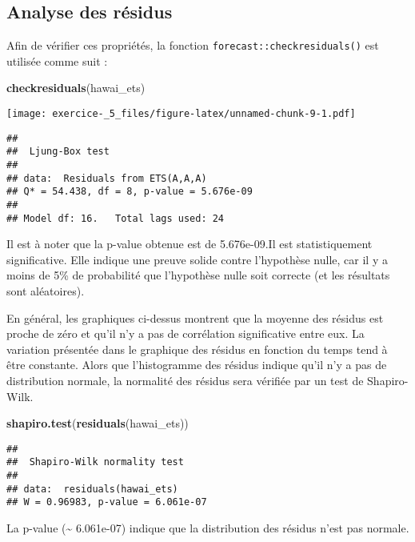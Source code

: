\documentclass[
]{article}
\newenvironment{Shaded}{\begin{snugshade}}{\end{snugshade}}
\newcommand{\KeywordTok}[1]{\textcolor[rgb]{0.13,0.29,0.53}{\textbf{#1}}}
\newcommand{\NormalTok}[1]{#1}
\begin{document}
\hypertarget{analyse-des-ruxe9sidus}{%
\subsection{Analyse des résidus}\label{analyse-des-ruxe9sidus}}

Afin de vérifier ces propriétés, la fonction
\texttt{forecast::checkresiduals()} est utilisée comme suit :

\begin{Shaded}
\begin{Highlighting}[]
\KeywordTok{checkresiduals}\NormalTok{(hawai_ets)}
\end{Highlighting}
\end{Shaded}

\texttt{[image: exercice-\_5\_files/figure-latex/unnamed-chunk-9-1.pdf]}

\begin{verbatim}
## 
##  Ljung-Box test
## 
## data:  Residuals from ETS(A,A,A)
## Q* = 54.438, df = 8, p-value = 5.676e-09
## 
## Model df: 16.   Total lags used: 24
\end{verbatim}

Il est à noter que la p-value obtenue est de 5.676e-09.Il est
statistiquement significative. Elle indique une preuve solide contre
l'hypothèse nulle, car il y a moins de 5\% de probabilité que
l'hypothèse nulle soit correcte (et les résultats sont aléatoires).

En général, les graphiques ci-dessus montrent que la moyenne des résidus
est proche de zéro et qu'il n'y a pas de corrélation significative entre
eux. La variation présentée dans le graphique des résidus en fonction du
temps tend à être constante. Alors que l'histogramme des résidus indique
qu'il n'y a pas de distribution normale, la normalité des résidus sera
vérifiée par un test de Shapiro-Wilk.

\begin{Shaded}
\begin{Highlighting}[]
\KeywordTok{shapiro.test}\NormalTok{(}\KeywordTok{residuals}\NormalTok{(hawai_ets))}
\end{Highlighting}
\end{Shaded}

\begin{verbatim}
## 
##  Shapiro-Wilk normality test
## 
## data:  residuals(hawai_ets)
## W = 0.96983, p-value = 6.061e-07
\end{verbatim}

La p-value (\textasciitilde{} 6.061e-07) indique que la distribution des
résidus n'est pas normale.
\end{document}
